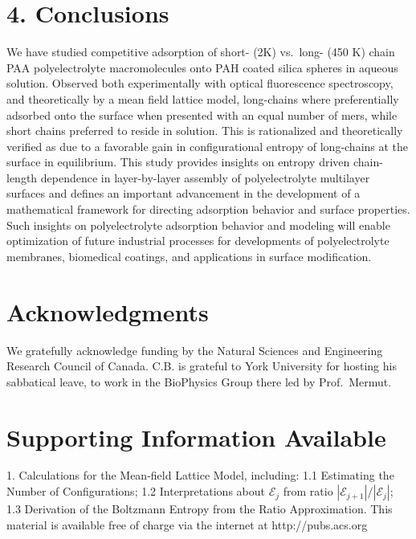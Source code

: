 \documentclass[journal=mamobx,manuscript=article]{achemso}
\begin{document}


\section{4. Conclusions}
   \label{sec-conc}

We have studied competitive adsorption of short- (2K) vs.\ long- (450 K) chain PAA polyelectrolyte macromolecules onto PAH coated silica spheres in aqueous solution. Observed both experimentally with optical fluorescence spectroscopy, and theoretically by a mean field lattice model, long-chains where preferentially adsorbed onto the surface when presented with an equal number of mers, while short chains preferred to reside in solution. This is rationalized and theoretically verified as due to a favorable gain in configurational entropy of long-chains at the surface in equilibrium. This study provides insights on entropy driven chain-length dependence in layer-by-layer assembly of polyelectrolyte multilayer surfaces and defines an important advancement in the development of a mathematical framework for directing adsorption behavior and surface properties. Such insights on polyelectrolyte adsorption behavior and modeling will enable optimization of future industrial processes for developments of polyelectrolyte membranes, biomedical coatings, and applications in surface modification.


\section{Acknowledgments}
We gratefully acknowledge funding by the Natural 
Sciences and Engineering Research Council of Canada.
C.B. is grateful to York University for hosting his sabbatical leave, to work in the BioPhysics Group there led by Prof.\ Mermut.

\section{Supporting Information Available}
1.  Calculations for the Mean-field Lattice Model, 
including: 1.1 Estimating the Number of Configurations;
1.2 Interpretations about $\mathcal{E}_j$ from 
ratio $|\mathcal{E}_{j+1}|/|\mathcal{E}_j|$;
1.3 Derivation of the Boltzmann Entropy from the 
Ratio Approximation.  This material is available free of
charge via the internet at  http://pubs.acs.org


\end{document}
